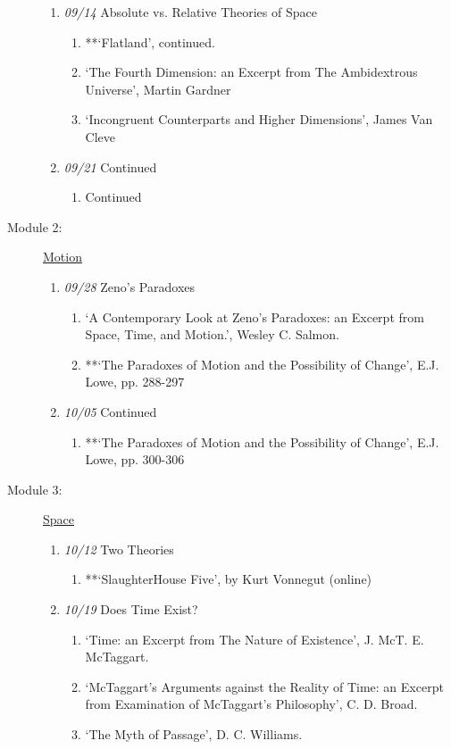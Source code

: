 \documentclass[article,oneside]{memoir}
\begin{document}
\begin{description}
\begin{enumerate}
\item \textit{09/14} Absolute vs. Relative Theories of Space
\begin{enumerate}
\item **`Flatland', continued.
\item `The Fourth Dimension: an Excerpt from The Ambidextrous Universe', Martin Gardner
\item `Incongruent Counterparts and Higher Dimensions', James Van Cleve
\end{enumerate}
\item \textit{09/21} Continued
\begin{enumerate}
\item Continued
\end{enumerate}
\end{enumerate}
\item[Module 2:] \href{http://scoconno.github.io/Teaching/Metaphysics/Motion}{Motion}
\begin{enumerate}
\item \textit{09/28} Zeno's Paradoxes
\begin{enumerate}
\item `A Contemporary Look at Zeno’s Paradoxes: an Excerpt from Space, Time, and Motion.', Wesley C. Salmon. 
\item **`The Paradoxes of Motion and the Possibility of Change', E.J. Lowe, pp. 288-297
\end{enumerate}
\item \textit{10/05} Continued
\begin{enumerate}
\item **`The Paradoxes of Motion and the Possibility of Change', E.J. Lowe, pp. 300-306
\end{enumerate}
\end{enumerate}
\item[Module 3:] \href{http://scoconno.github.io/Teaching/Metaphysics/Space}{Space}
\begin{enumerate}
\item \textit{10/12} Two Theories
\begin{enumerate}
\item **`SlaughterHouse Five', by Kurt Vonnegut (online)
\end{enumerate}
\item  \textit{10/19} Does Time Exist?
\begin{enumerate}
\item `Time: an Excerpt from The Nature of Existence', J. McT. E. McTaggart.
\item `McTaggart’s Arguments against the Reality of Time: an Excerpt from Examination of McTaggart’s Philosophy', C. D. Broad.
\item `The Myth of Passage', D. C. Williams.
\end{enumerate}


\end{enumerate}
\end{description}
\end{document}
